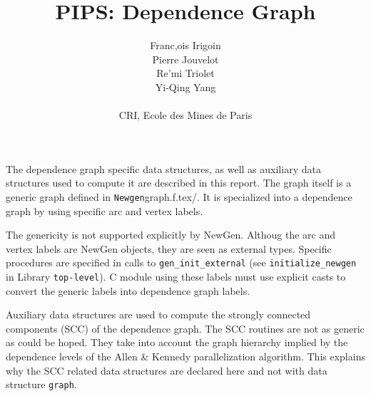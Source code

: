 

\title{PIPS: Dependence Graph}
\author{Franc,ois Irigoin \\
    Pierre Jouvelot \\
    Re'mi Triolet\\
    Yi-Qing Yang \\
\\
    CRI, Ecole des Mines de Paris}

\newcommand{\domain}[2]{\paragraph{{#1}}\paragraph{}{#2}}


\maketitle

\sloppy

The dependence graph specific data structures, as well as auxiliary data
structures used to compute it are described in this report. The graph
itself is a generic graph defined in \verb/Newgen/graph.f.tex/. It is
specialized into a dependence graph by using specific arc and vertex
labels. 

The genericity is not supported explicitly by NewGen. Althoug the arc
and vertex labels are NewGen objects, they are seen as external
types. Specific procedures are specified in calls to
\verb/gen_init_external/ (see \verb/initialize_newgen/ in Library
\verb/top-level/). C module using these labels must use explicit
casts to convert the generic labels into dependence graph labels.

Auxiliary data structures are used to compute the strongly connected
components (SCC) of the dependence graph. The SCC routines are not as
generic as could be hoped. They take into account the graph hierarchy
implied by the dependence levels of the Allen \& Kennedy parallelization
algorithm. This explains why the SCC related data structures are
declared here and not with data structure \verb/graph/.

\iffalse
Les structures de donne'es suivantes sont utilise'es par la phase de
construction du graphe des de'pendances. Elles sont construites en
utilisant les structures de donne'es \verb+statement+ et \verb+effect+
qui ont e'te' de'finies dans la repre'sentation interne, ainsi que la
structure de donne'es ge'ne'riques \verb+vertex+ qui fait partie du
package {\em graph}.
\fi

